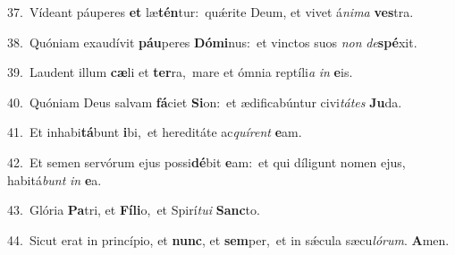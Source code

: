 {\numbfont\textcolor{\numbcolor}{37.}}~Vídeant páuperes \textbf{et} læ\-\textbf{tén}\-tur:~\star quǽrite Deum, et vivet á\-\textit{ni}\-\textit{ma} \textbf{ves}\-tra.\par
{\numbfont\textcolor{\numbcolor}{38.}}~Quóniam exaudívit \textbf{páu}\-peres \textbf{Dó}\-\textbf{mi}nus:~\star et vinctos suos \textit{non} \textit{de}\-\textbf{spé}xit.\par
{\numbfont\textcolor{\numbcolor}{39.}}~Laudent illum \textbf{cæ}\-li et \textbf{ter}\-ra,~\star mare et ómnia reptíli\textit{a} \textit{in} \textbf{e}\-is.\par
{\numbfont\textcolor{\numbcolor}{40.}}~Quóniam Deus salvam \textbf{fá}\-ciet \textbf{Si}\-on:~\star et ædificabúntur civi\-\textit{tá}\-\textit{tes} \textbf{Ju}\-da.\par
{\numbfont\textcolor{\numbcolor}{41.}}~Et inhabi\-\textbf{tá}\-bunt \textbf{i}\-bi,~\star et hereditáte ac\-\textit{quí}\-\textit{rent} \textbf{e}\-am.\par
{\numbfont\textcolor{\numbcolor}{42.}}~Et semen servórum ejus possi\-\textbf{dé}\-bit \textbf{e}\-am:~\star et qui díligunt nomen ejus, habitá\textit{bunt} \textit{in} \textbf{e}\-a.\par
{\numbfont\textcolor{\numbcolor}{43.}}~Glória \textbf{Pa}\-tri, et \textbf{Fí}\-\textbf{li}o,~\star et Spirí\-\textit{tu}\-\textit{i} \textbf{Sanc}\-to.\par
{\numbfont\textcolor{\numbcolor}{44.}}~Sicut erat in princípio, et \textbf{nunc}\-, et \textbf{sem}\-per,~\star et in sǽcula sæcu\-\textit{ló}\-\textit{rum}. \textbf{A}\-men.\par
